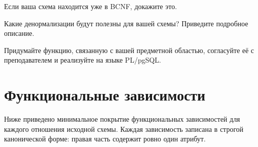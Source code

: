 \documentclass[12pt,a4paper]{article}
\begin{document}
Если ваша схема находится уже в BCNF, докажите это.

Какие денормализации будут полезны для вашей схемы?
Приведите подробное описание.

Придумайте функцию, связанную с вашей предметной областью, согласуйте
её с преподавателем и реализуйте на языке PL/pgSQL.

\newpage
\section{Функциональные зависимости}

Ниже приведено минимальное покрытие функциональных зависимостей для каждого
отношения исходной схемы. Каждая зависимость записана в строгой канонической
форме: правая часть содержит ровно один атрибут.
\end{document}
